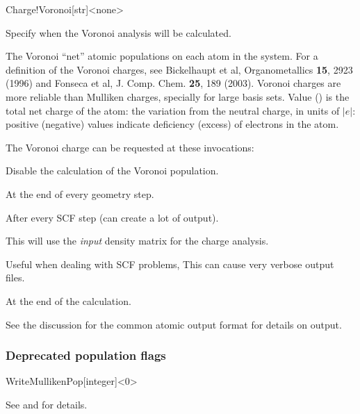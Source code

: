 \begin{fdfentry}{Charge!Voronoi}[str]<none>
  
  Specify when the Voronoi analysis will be calculated.

  The Voronoi ``net''
  atomic populations on each atom in the system. For a definition of
  the Voronoi charges, see Bickelhaupt et al, Organometallics
  \textbf{15}, 2923 (1996) and Fonseca et al,
  J. Comp. Chem. \textbf{25}, 189 (2003).  Voronoi charges are more
  reliable than Mulliken charges, specially for large basis
  sets. Value () is the total net charge of the atom: the
  variation from the neutral charge, in units of $|e|$: positive
  (negative) values indicate deficiency (excess) of electrons in the
  atom.

  The Voronoi charge can be requested at these invocations:

  \begin{fdfoptions}
    \option[none]%
    Disable the calculation of the Voronoi population.

    \option[geometry]%
    At the end of every geometry step.

    \option[scf]%
    After every SCF step (can create a lot of output).

    This will use the \emph{input} density matrix for the charge analysis.

    Useful when dealing with SCF problems,
    This can cause very verbose output files.
    
    \option[end]%
    At the end of the calculation.

  \end{fdfoptions}
  
  See the discussion for the common atomic output format for details on output. 

\end{fdfentry}


\subsubsection{Deprecated population flags}

\begin{fdfentry}{WriteMullikenPop}[integer]<0>

  See  and  for details.
  
\end{fdfentry}


